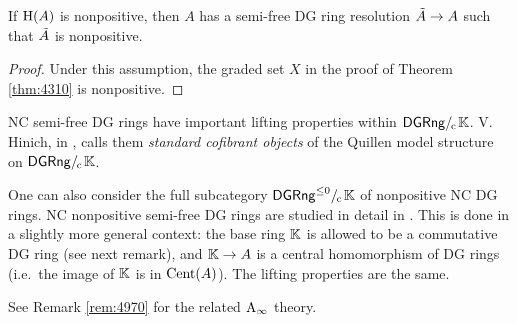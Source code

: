 \begin{cor} \label{cor:4605}
If $\operatorname{H}(A)$ is nonpositive, then $A$ has a semi-free DG ring resolution 
$\tilde{A} \to A$  such that $\tilde{A}$ is nonpositive. 
\end{cor}

\begin{proof}
Under this assumption, the graded set $X$ in the proof of Theorem \ref{thm:4310} 
is nonpositive.
\end{proof}

\begin{rem} \label{rem:4605}
NC semi-free DG rings have important lifting properties within 
$\mathrm{\mathsf{DGRng}} /_{\mspace{-2mu} \mathrm{c}} \mspace{2mu} \mathbb{K}$.
V. Hinich, in \cite{Hi1}, calls them {\em standard cofibrant objects} of the 
Quillen model structure on $\mathrm{\mathsf{DGRng}} /_{\mspace{-2mu} \mathrm{c}} \mspace{2mu} \mathbb{K}$.

One can also consider the full subcategory $\mathrm{\mathsf{DGRng}}^{\leq 0} /_{\mspace{-2mu} \mathrm{c}} \mspace{2mu} \mathbb{K}$
of nonpositive NC DG rings. NC nonpositive semi-free DG rings
are studied in detail in \cite{Ye9}. This is done in a slightly more general 
context: the base ring $\mathbb{K}$ is allowed to be a commutative DG ring (see next 
remark), and $\mathbb{K} \to A$ is a central homomorphism of DG 
rings (i.e.\ the image of $\mathbb{K}$ is in $\operatorname{Cent}(A)$). 
The lifting properties are the same. 

See Remark \ref{rem:4970} for the related $\mathrm{A}_{\infty}$ theory. 
\end{rem}


